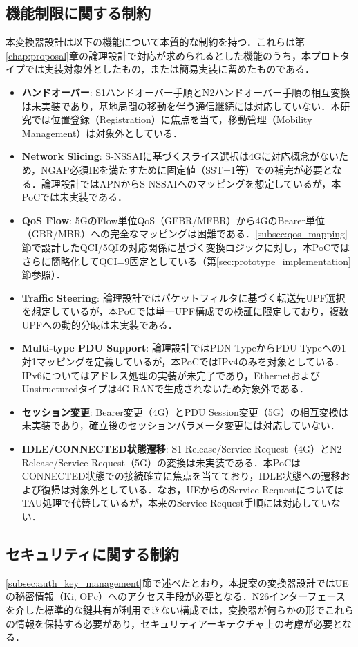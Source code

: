 \subsection{機能制限に関する制約}
本変換器設計は以下の機能について本質的な制約を持つ．これらは第\ref{chap:proposal}章の論理設計で対応が求められるとした機能のうち，本プロトタイプでは実装対象外としたもの，または簡易実装に留めたものである．
\begin{itemize}
\item \textbf{ハンドオーバー}: S1ハンドオーバー手順とN2ハンドオーバー手順の相互変換は未実装であり，基地局間の移動を伴う通信継続には対応していない．本研究では位置登録（Registration）に焦点を当て，移動管理（Mobility Management）は対象外としている．
\item \textbf{Network Slicing}: S-NSSAIに基づくスライス選択は4Gに対応概念がないため，NGAP必須IEを満たすために固定値（SST=1等）での補完が必要となる．論理設計ではAPNからS-NSSAIへのマッピングを想定しているが，本PoCでは未実装である．
\item \textbf{QoS Flow}: 5GのFlow単位QoS\allowbreak （GFBR/MFBR）から4GのBearer単位\allowbreak （GBR/MBR）への完全なマッピングは困難である．\ref{subsec:qos_mapping}節で設計したQCI/5QIの対応関係に基づく変換ロジックに対し，本PoCではさらに簡略化してQCI=9固定としている（第\ref{sec:prototype_implementation}節参照）．
\item \textbf{Traffic Steering}: 論理設計ではパケットフィルタに基づく転送先UPF選択を想定しているが，本PoCでは単一UPF構成での検証に限定しており，複数UPFへの動的分岐は未実装である．
\item \textbf{Multi-type PDU Support}: 論理設計ではPDN TypeからPDU Typeへの1対1マッピングを定義しているが，本PoCではIPv4のみを対象としている．IPv6についてはアドレス処理の実装が未完了であり，EthernetおよびUnstructuredタイプは4G RANで生成されないため対象外である．
\item \textbf{セッション変更}: Bearer変更（4G）とPDU Session変更（5G）の相互変換は未実装であり，確立後のセッションパラメータ変更には対応していない．
\item \textbf{IDLE/CONNECTED状態遷移}: S1 Release/Service Request（4G）とN2 Release/Service Request（5G）の変換は未実装である．本PoCはCONNECTED状態での接続確立に焦点を当てており，IDLE状態への遷移および復帰は対象外としている．なお，UEからのService RequestについてはTAU処理で代替しているが，本来のService Request手順には対応していない．
\end{itemize}

\subsection{セキュリティに関する制約}
\label{subsec:security_constraints}
\ref{subsec:auth_key_management}節で述べたとおり，本提案の変換器設計ではUEの秘密情報（Ki, OPc）へのアクセス手段が必要となる．N26インターフェースを介した標準的な鍵共有が利用できない構成では，変換器が何らかの形でこれらの情報を保持する必要があり，セキュリティアーキテクチャ上の考慮が必要となる．

